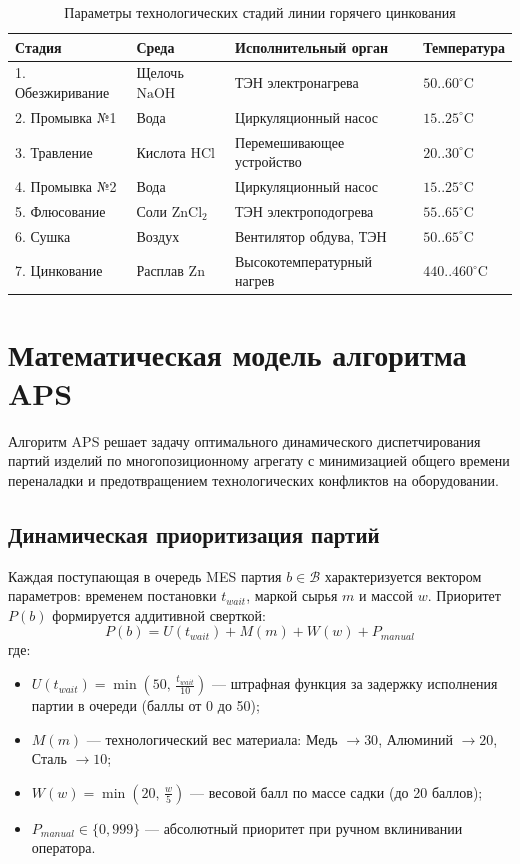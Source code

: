 \documentclass[14pt, a4paper]{extarticle}
\begin{document}
\begin{table}[h!]
\centering
\caption{Параметры технологических стадий линии горячего цинкования}
\begin{tabularx}{\textwidth}{|l|l|X|l|}
\hline
\textbf{Стадия} & \textbf{Среда} & \textbf{Исполнительный орган} & \textbf{Температура} \\
\hline
1. Обезжиривание & Щелочь $\mathrm{NaOH}$ & ТЭН электронагрева & $50..60^\circ\text{C}$ \\
2. Промывка №1 & Вода & Циркуляционный насос & $15..25^\circ\text{C}$ \\
3. Травление & Кислота $\mathrm{HCl}$ & Перемешивающее устройство & $20..30^\circ\text{C}$ \\
4. Промывка №2 & Вода & Циркуляционный насос & $15..25^\circ\text{C}$ \\
5. Флюсование & Соли $\mathrm{ZnCl}_2$ & ТЭН электроподогрева & $55..65^\circ\text{C}$ \\
6. Сушка & Воздух & Вентилятор обдува, ТЭН & $50..65^\circ\text{C}$ \\
7. Цинкование & Расплав $\mathrm{Zn}$ & Высокотемпературный нагрев & $440..460^\circ\text{C}$ \\
\hline
\end{tabularx}
\end{table}

\newpage
\section{Математическая модель алгоритма APS}

Алгоритм APS решает задачу оптимального динамического диспетчирования партий изделий по многопозиционному агрегату с минимизацией общего времени переналадки и предотвращением технологических конфликтов на оборудовании.

\subsection{Динамическая приоритизация партий}
Каждая поступающая в очередь MES партия $b \in \mathcal{B}$ характеризуется вектором параметров: временем постановки $t_{wait}$, маркой сырья $m$ и массой $w$. Приоритет $P(b)$ формируется аддитивной сверткой:
\begin{equation}
P(b) = U(t_{wait}) + M(m) + W(w) + P_{manual}
\end{equation}
где:
\begin{itemize}
    \item $U(t_{wait}) = \min\left(50,\, \frac{t_{wait}}{10}\right)$ --- штрафная функция за задержку исполнения партии в очереди (баллы от 0 до 50);
    \item $M(m)$ --- технологический вес материала: Медь $\to 30$, Алюминий $\to 20$, Сталь $\to 10$;
    \item $W(w) = \min\left(20,\, \frac{w}{5}\right)$ --- весовой балл по массе садки (до 20 баллов);
    \item $P_{manual} \in \{0, 999\}$ --- абсолютный приоритет при ручном вклинивании оператора.
\end{itemize}
\end{document}
